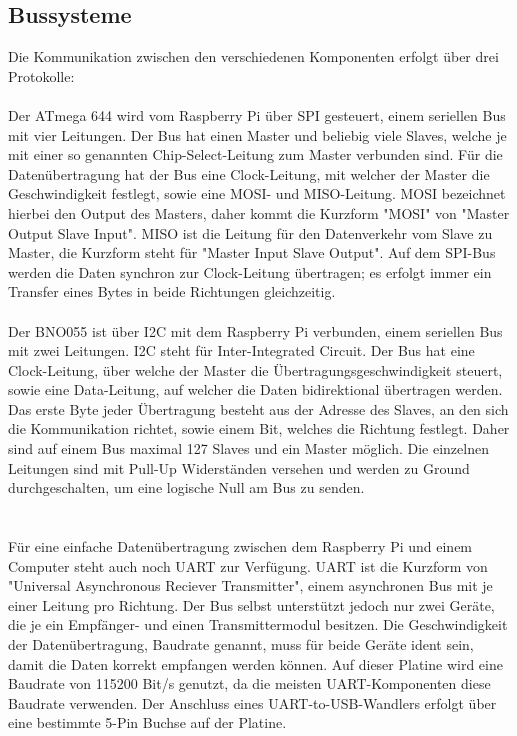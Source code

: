 \documentclass[12pt]{article}
\begin{document}
\subsection{Bussysteme}
Die Kommunikation zwischen den verschiedenen Komponenten erfolgt über drei Protokolle:
\\\\Der ATmega 644 wird vom Raspberry Pi über SPI gesteuert, einem seriellen Bus mit vier Leitungen. Der Bus hat einen Master und beliebig viele Slaves, welche je mit einer so genannten Chip-Select-Leitung zum Master verbunden sind. Für die Datenübertragung hat der Bus eine Clock-Leitung, mit welcher der Master die Geschwindigkeit festlegt, sowie eine MOSI- und MISO-Leitung. MOSI bezeichnet hierbei den Output des Masters, daher kommt die Kurzform "MOSI" von "Master Output Slave Input". MISO ist die Leitung für den Datenverkehr vom Slave zu Master, die Kurzform steht für "Master Input Slave Output". Auf dem SPI-Bus werden die Daten synchron zur Clock-Leitung übertragen; es erfolgt immer ein Transfer eines Bytes in beide Richtungen gleichzeitig.
\\\\Der BNO055 ist über I2C mit dem Raspberry Pi verbunden, einem seriellen Bus mit zwei Leitungen. I2C steht für Inter-Integrated Circuit. Der Bus hat eine Clock-Leitung, über welche der Master die Übertragungsgeschwindigkeit steuert, sowie eine Data-Leitung, auf welcher die Daten bidirektional übertragen werden. Das erste Byte jeder Übertragung besteht aus der Adresse des Slaves, an den sich die Kommunikation richtet, sowie einem Bit, welches die Richtung festlegt. Daher sind auf einem Bus maximal 127 Slaves und ein Master möglich. Die einzelnen Leitungen sind mit Pull-Up Widerständen versehen und werden zu Ground durchgeschalten, um eine logische Null am Bus zu senden.
\\\\\\Für eine einfache Datenübertragung zwischen dem Raspberry Pi und einem Computer steht auch noch UART zur Verfügung. UART ist die Kurzform von "Universal Asynchronous Reciever Transmitter", einem asynchronen Bus mit je einer Leitung pro Richtung. Der Bus selbst unterstützt jedoch nur zwei Geräte, die je ein Empfänger- und einen Transmittermodul besitzen. Die Geschwindigkeit der Datenübertragung, Baudrate genannt, muss für beide Geräte ident sein, damit die Daten korrekt empfangen werden können. Auf dieser Platine wird eine Baudrate von 115200 Bit/s genutzt, da die meisten UART-Komponenten diese Baudrate verwenden. Der Anschluss eines UART-to-USB-Wandlers erfolgt über eine bestimmte 5-Pin Buchse auf der Platine.
\end{document}
